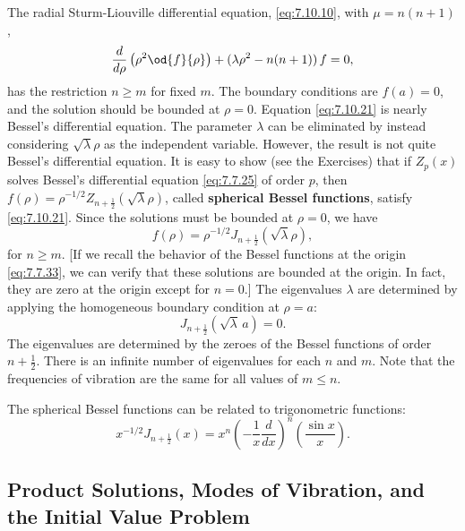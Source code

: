 The radial Sturm-Liouville differential equation, \eqref{eq:7.10.10}, with $\mu = n(n+1)$,
\begin{equation}
\frac{d}{d \rho}\left(\rho^2\od{f}{\rho}\right) + (\lambda\rho^2 - n(n+1))\,f = 0,
\label{eq:7.10.21}
\end{equation}
has the restriction $n \geq m$ for fixed $m$.  The boundary conditions are $f(a) = 0$, and the solution should be bounded at $\rho = 0$.  Equation \eqref{eq:7.10.21} is nearly Bessel's differential equation.  The parameter $\lambda$ can be eliminated by instead considering $\sqrt{\lambda}\rho$ as the independent variable.  However, the result is not quite Bessel's differential equation.  It is easy to show (see the Exercises) that if $Z_p(x)$ solves Bessel's differential equation \eqref{eq:7.7.25} of order $p$, then $f(\rho) = \rho^{-1/2}Z_{n+\frac{1}{2}}(\sqrt{\lambda}\rho)$, called \textbf{spherical Bessel functions}, satisfy \eqref{eq:7.10.21}.  Since the solutions must be bounded at $\rho = 0$, we have
\begin{equation}
f(\rho) = \rho^{-1/2}J_{n+\frac{1}{2}}(\sqrt{\lambda}\rho),
\label{eq:7.10.22}
\end{equation}
for $n \geq m$.  [If we recall the behavior of the Bessel functions at the origin \eqref{eq:7.7.33}, we can verify that these solutions are bounded at the origin.  In fact, they are zero at the origin except for $n = 0$.]  The eigenvalues $\lambda$ are determined by applying the homogeneous boundary condition at $\rho = a$:
\begin{equation}
\boxed{J_{n+\frac{1}{2}}(\sqrt{\lambda}\,a) = 0.}
\label{eq:7.10.23}
\end{equation}
The eigenvalues are determined by the zeroes of the Bessel functions of order $n + \frac{1}{2}$.  There is an infinite number of eigenvalues for each $n$ and $m$.  Note that the frequencies of vibration are the same for all values of $m \leq n$.

The spherical Bessel functions can be related to trigonometric functions:
\begin{equation}
\boxed{x^{-1/2}J_{n+\frac{1}{2}}(x) = x^n\left(-\frac{1}{x}\frac{d}{d x}\right)^n\left(\frac{\sin x}{x}\right).}
\label{eq:7.10.24}
\end{equation}

\subsection{Product Solutions, Modes of Vibration, and the Initial Value Problem}
\label{sec:7.10.5}

